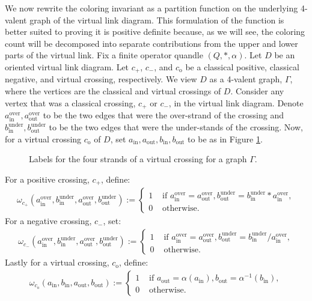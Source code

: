 \documentclass[11pt, twoside]{amsart}
\numberwithin{equation}{section}
\theoremstyle{definition}
\numberwithin{equation}{section}
\begin{document}
We now rewrite the coloring invariant as a partition function on the underlying 4-valent graph of the virtual link diagram. This formulation of the function is better suited to proving it is positive definite because, as we will see, the coloring count will be decomposed into separate contributions from the upper and lower parts of the virtual link. Fix a finite operator quandle $(Q,*,\alpha)$. Let $D$ be an oriented virtual link diagram. Let $c_+$, $c_-$, and $c_{\text{o}}$ be a classical positive, classical negative, and virtual crossing, respectively. We view $D$ as a 4-valent graph, $\Gamma$, where the vertices are the classical and virtual crossings of $D$. Consider any vertex that was a classical crossing, $c_+$ or $c_-$, in the virtual link diagram. Denote $a_{\text{in}}^{\text{over}}, a_{\text{out}}^{\text{over}}$ to be the two edges that were the over-strand of the crossing and $b_{\text{in}}^{\text{under}}, b_{\text{out}}^{\text{under}}$ to be the two edges that were the under-stands of the crossing. Now, for a virtual crossing $c_{\text{o}}$ of $D$, set $a_{\text{in}}, a_{\text{out}}, b_{\text{in}}, b_{\text{out}}$ to be as in Figure \ref{fig: virtual crossings for partition function}.

\begin{figure}[h!]
    \centering
    \operatorquandlevirtualgraph
    \caption{Labels for the four strands of a virtual crossing for a graph $\Gamma$.}
      \label{fig: virtual crossings for partition function}
\end{figure}

For a positive crossing, $c_+$, define:
\begin{align*}
    \omega_{c_+}(a_{\text{in}}^\text{over}, b_{\text{in}}^\text{under}, a_{\text{out}}^\text{over},b_{\text{out}}^\text{under}):= \begin{cases}
        1 &\text{ if } a_\text{in}^\text{over}=a_\text{out}^\text{over}, b_\text{out}^\text{under}=b_\text{in}^\text{under}*a_\text{in}^\text{over},\\
        0 &\text{ otherwise.}
    \end{cases}
\end{align*}
For a negative crossing, $c_-$, set:
\begin{align*}
    \omega_{c_-}(a_{\text{in}}^\text{over}, b_{\text{in}}^\text{under}, a_{\text{out}}^\text{over},b_{\text{out}}^\text{under}):=\begin{cases}
        1 &\text{ if } a_{\text{in}}^\text{over}=a_\text{out}^\text{over}, b_\text{out}^\text{under}=b_{\text{in}}^\text{under}/a_\text{in}^\text{over}, \\
        0 &\text{ otherwise.}
    \end{cases}
\end{align*}
Lastly for a virtual crossing, $c_{\text{o}}$, define:
\begin{align*}
    \omega_{c_\text{o}}(a_\text{in}, b_\text{in}, a_\text{out}, b_\text{out}):=\begin{cases}
        1&\text{ if } a_{\text{out}}=\alpha(a_\text{in}), b_\text{out}=\alpha^{-1}(b_\text{in}),\\
        0&\text{ otherwise.}
    \end{cases}
\end{align*}
\end{document}
